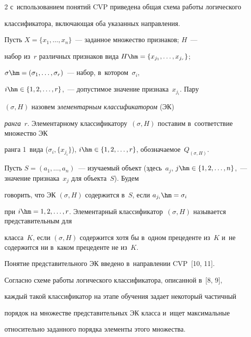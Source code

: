 \begin{multicols}{2}
с~использованием понятий CVP приведена общая схема работы логического 


классификатора, включающая оба указанных направления. 


  


  Пусть $X=\{x_1, \ldots , x_n\}$~--- заданное множество признаков; $H$~--- 


набор из~$r$ различных признаков вида $H\hm= \{ x_{j_1},\ldots , x_{j_r}\}$; 


$\sigma\hm= (\sigma_1, \ldots , \sigma_r)$~--- набор, в~котором~$\sigma_i$, 


$i\hm\in \{1, 2, \ldots , r\}$,~--- допустимое значение признака~$x_{j_i}$. Пару 


$(\sigma, H)$ назовем \textit{элементарным классификатором} (ЭК) 


\textit{ранга}~$r$. Элементарному классификатору~$(\sigma, H)$ поставим в~соответствие множество ЭК 


ранга 1~вида ($\sigma_i, \{ x_{j_i}\}$), $i\hm\in \{1,2,\ldots , r\}$, обозначаемое~$Q_{(\sigma, H)}$. 


  


  Пусть $S=(a_1, \ldots , a_n)$~--- изучаемый объект (здесь~$a_j$, $j\hm\in 


\{1,2,\ldots , n\}$,~--- значение признака~$x_j$ для объекта~$S$). Будем 


говорить, что ЭК $(\sigma, H)$ содержится в~$S$, если $a_{j_i}\hm=\sigma_i$ 


при $i\hm= 1,2,\ldots , r$. Элементарный классификатор~$(\sigma, H)$ называется представительным для 


класса~$K$, если $(\sigma, H)$ содержится хотя бы в~одном прецеденте из~$K$ и~не содержится ни в~каком прецеденте не из~$K$. 


  


  Понятие представительного ЭК введено в~направлении CVP~[10, 11]. 


Согласно схеме работы логического классификатора, описанной в~[8, 9], 


каждый такой классификатор на этапе обучения задает некоторый час\-тич\-ный 


порядок на множестве представительных ЭК класса и~ищет максимальные 


относительно заданного порядка элементы этого множества. 



\end{multicols}
